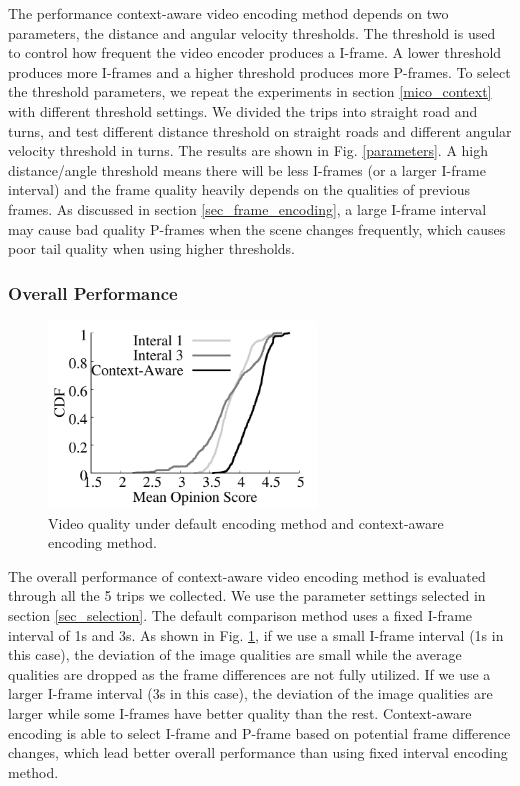 The performance context-aware video encoding method depends on
two parameters, the distance and angular velocity thresholds.
The threshold is used to control how frequent the video 
encoder produces a I-frame. 
A lower threshold produces more I-frames and a higher
threshold produces more P-frames. 
To select the threshold parameters, we repeat the 
experiments in section \ref{mico_context} with different 
threshold settings.
We divided the trips into straight road and turns, 
and test different distance threshold on straight roads and
different angular velocity threshold in turns. 
The results are shown in Fig. \ref{parameters}. 
A high distance/angle threshold means there will be less 
I-frames (or a larger I-frame interval) and the frame quality heavily depends 
on the qualities of previous frames. 
As discussed in section \ref{sec_frame_encoding}, 
a large I-frame interval may cause bad quality P-frames 
when the scene changes frequently, 
which causes poor tail quality when using higher
thresholds. 

\subsubsection{Overall Performance}



\begin{figure}[t]
\centering
\includegraphics[width=2.8in,angle=0]{Figs/RTDrive/evaluation/context_quality.pdf}
\caption{Video quality under default encoding method
and context-aware encoding method.}
\vspace{-0.2cm}
\label{context_quality}
\centering
\end{figure}


The overall performance of context-aware video encoding method is evaluated
through all the 5 trips we collected. 
We use the parameter settings selected in section \ref{sec_selection}.
The default comparison method uses a fixed I-frame interval of 1s and 3s.
As shown in Fig. \ref{context_quality}, 
if we use a small I-frame interval (1s in this case), the deviation of the image
qualities are small while the average qualities are dropped
as the frame differences are not fully utilized. 
If we use a larger I-frame interval (3s in this case), 
the deviation of the image qualities are larger while some I-frames
have better quality than the rest.
Context-aware encoding is able to select I-frame and P-frame
based on potential frame difference changes, 
which lead better overall performance than using
fixed interval encoding method.  


